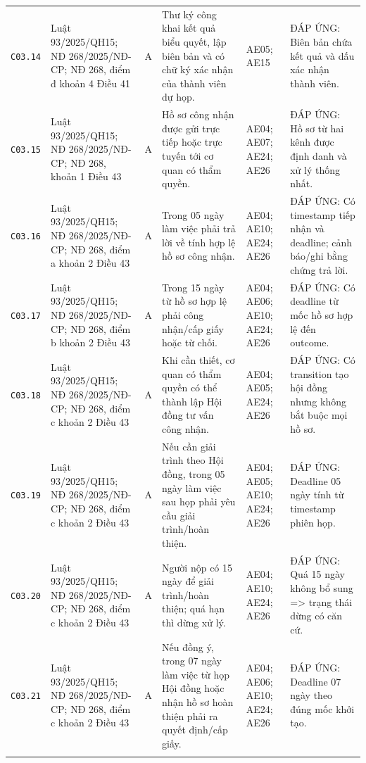 \begin{longtable}{@{}p{0.9cm}p{3.0cm}p{0.55cm}p{4.05cm}p{2.0cm}p{3.45cm}@{}}
\texttt{C03.14} & Luật 93/2025/QH15; NĐ 268/2025/NĐ-CP; NĐ 268, điểm đ khoản 4 Điều 41 & A & Thư ký công khai kết quả biểu quyết, lập biên bản và có chữ ký xác nhận của thành viên dự họp. & AE05; AE15 & ĐÁP ỨNG: Biên bản chứa kết quả và dấu xác nhận thành viên. \\ \addlinespace[1pt]
\texttt{C03.15} & Luật 93/2025/QH15; NĐ 268/2025/NĐ-CP; NĐ 268, khoản 1 Điều 43 & A & Hồ sơ công nhận được gửi trực tiếp hoặc trực tuyến tới cơ quan có thẩm quyền. & AE04; AE07; AE24; AE26 & ĐÁP ỨNG: Hồ sơ từ hai kênh được định danh và xử lý thống nhất. \\ \addlinespace[1pt]
\texttt{C03.16} & Luật 93/2025/QH15; NĐ 268/2025/NĐ-CP; NĐ 268, điểm a khoản 2 Điều 43 & A & Trong 05 ngày làm việc phải trả lời về tính hợp lệ hồ sơ công nhận. & AE04; AE10; AE24; AE26 & ĐÁP ỨNG: Có timestamp tiếp nhận và deadline; cảnh báo/ghi bằng chứng trả lời. \\ \addlinespace[1pt]
\texttt{C03.17} & Luật 93/2025/QH15; NĐ 268/2025/NĐ-CP; NĐ 268, điểm b khoản 2 Điều 43 & A & Trong 15 ngày từ hồ sơ hợp lệ phải công nhận/cấp giấy hoặc từ chối. & AE04; AE06; AE10; AE24; AE26 & ĐÁP ỨNG: Có deadline từ mốc hồ sơ hợp lệ đến outcome. \\ \addlinespace[1pt]
\texttt{C03.18} & Luật 93/2025/QH15; NĐ 268/2025/NĐ-CP; NĐ 268, điểm c khoản 2 Điều 43 & A & Khi cần thiết, cơ quan có thẩm quyền có thể thành lập Hội đồng tư vấn công nhận. & AE04; AE05; AE24; AE26 & ĐÁP ỨNG: Có transition tạo hội đồng nhưng không bắt buộc mọi hồ sơ. \\ \addlinespace[1pt]
\texttt{C03.19} & Luật 93/2025/QH15; NĐ 268/2025/NĐ-CP; NĐ 268, điểm c khoản 2 Điều 43 & A & Nếu cần giải trình theo Hội đồng, trong 05 ngày làm việc sau họp phải yêu cầu giải trình/hoàn thiện. & AE04; AE05; AE10; AE24; AE26 & ĐÁP ỨNG: Deadline 05 ngày tính từ timestamp phiên họp. \\ \addlinespace[1pt]
\texttt{C03.20} & Luật 93/2025/QH15; NĐ 268/2025/NĐ-CP; NĐ 268, điểm c khoản 2 Điều 43 & A & Người nộp có 15 ngày để giải trình/hoàn thiện; quá hạn thì dừng xử lý. & AE04; AE10; AE24; AE26 & ĐÁP ỨNG: Quá 15 ngày không bổ sung => trạng thái dừng có căn cứ. \\ \addlinespace[1pt]
\texttt{C03.21} & Luật 93/2025/QH15; NĐ 268/2025/NĐ-CP; NĐ 268, điểm c khoản 2 Điều 43 & A & Nếu đồng ý, trong 07 ngày làm việc từ họp Hội đồng hoặc nhận hồ sơ hoàn thiện phải ra quyết định/cấp giấy. & AE04; AE06; AE10; AE24; AE26 & ĐÁP ỨNG: Deadline 07 ngày theo đúng mốc khởi tạo. \\ \addlinespace[1pt]

\end{longtable}
